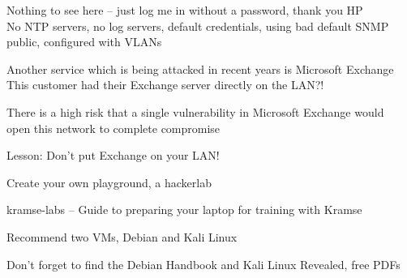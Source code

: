\documentclass[Screen16to9,17pt]{foils}
\begin{document}
\begin{list2}
\item Nothing to see here -- just log me in without a password, thank you HP\\
No NTP servers, no log servers, default credentials, using bad default SNMP public, configured with VLANs
\end{list2}



Another service which is being attacked in recent years is Microsoft Exchange\\
This customer had their Exchange server directly on the LAN?!

\begin{list2}
\item There is a high risk that a single vulnerability in Microsoft Exchange would \\
open this network to complete compromise
\end{list2}




\begin{list2}
\item Lesson: Don't put Exchange on your LAN!
\end{list2}



\begin{list2}
\item Create your own playground, a hackerlab
\item kramse-labs -- Guide to preparing your laptop for training with Kramse\\
\item Recommend two VMs, Debian and Kali Linux
\item Don't forget to find the Debian Handbook and Kali Linux Revealed, free PDFs
\end{list2}

\end{document}
